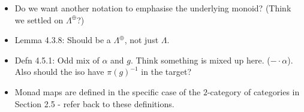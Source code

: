 \documentclass{amsart}
\begin{document}
\begin{itemize}
\item Do we want another notation to emphasise the underlying monoid? (Think we settled on $\Lambda^{\oplus}$?)
\item Lemma 4.3.8: Should be a $\Lambda^{\oplus}$, not just $\Lambda$.
\item Defn 4.5.1: Odd mix of $\alpha$ and $g$. Think something is mixed up here. ($- \cdot \alpha$). Also should the iso have $\pi(g)^{-1}$ in the target?
\item Monad maps are defined in the specific case of the $2$-category of categories in Section 2.5 - refer back to these definitions.
\end{itemize}
\end{document}
